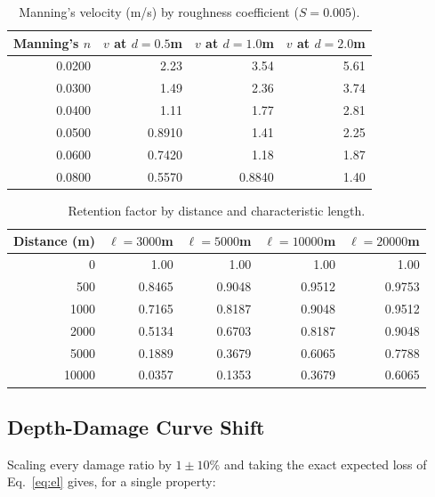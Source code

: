 \documentclass[11pt,a4paper]{article}
\begin{document}
\begin{table}[H]
    \centering
    \caption{Manning's velocity (m/s) by roughness coefficient ($S=0.005$).}
    \label{tab:sens_manning}
    \begin{tabular}{rrrr}
        \toprule
        \textbf{Manning's $n$} & \textbf{$v$ at $d=0.5$m} & \textbf{$v$ at $d=1.0$m} & \textbf{$v$ at $d=2.0$m} \\
        \midrule
        0.0200 & 2.23 & 3.54 & 5.61 \\
        0.0300 & 1.49 & 2.36 & 3.74 \\
        0.0400 & 1.11 & 1.77 & 2.81 \\
        0.0500 & 0.8910 & 1.41 & 2.25 \\
        0.0600 & 0.7420 & 1.18 & 1.87 \\
        0.0800 & 0.5570 & 0.8840 & 1.40 \\
        \bottomrule
    \end{tabular}
\end{table}

\begin{table}[H]
    \centering
    \caption{Retention factor by distance and characteristic length.}
    \label{tab:sens_ret}
    \begin{tabular}{rrrrr}
        \toprule
        \textbf{Distance (m)} & \textbf{$\ell=3000$m} & \textbf{$\ell=5000$m} & \textbf{$\ell=10000$m} & \textbf{$\ell=20000$m} \\
        \midrule
        0 & 1.00 & 1.00 & 1.00 & 1.00 \\
        500 & 0.8465 & 0.9048 & 0.9512 & 0.9753 \\
        1000 & 0.7165 & 0.8187 & 0.9048 & 0.9512 \\
        2000 & 0.5134 & 0.6703 & 0.8187 & 0.9048 \\
        5000 & 0.1889 & 0.3679 & 0.6065 & 0.7788 \\
        10000 & 0.0357 & 0.1353 & 0.3679 & 0.6065 \\
        \bottomrule
    \end{tabular}
\end{table}

\subsection{Depth-Damage Curve Shift}
Scaling every damage ratio by $1\pm10\%$ and taking the exact expected loss of
Eq.~\eqref{eq:el} gives, for a single property:
\end{document}

